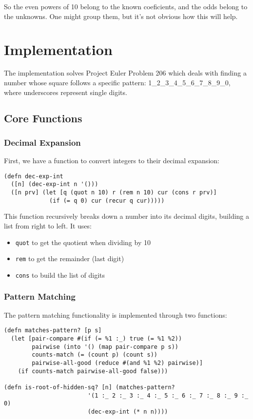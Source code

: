 \documentclass{article}
\begin{document}
So the even powers of 10 belong to the known coeficients, and the odds belong to the unknowns.  One might group
them, but it's not obvious how this will help.

\section{Implementation}

The implementation solves Project Euler Problem 206 which deals with finding a number whose square follows a specific pattern: 1_2_3_4_5_6_7_8_9_0, where underscores represent single digits.

\subsection{Core Functions}

\subsubsection{Decimal Expansion}
First, we have a function to convert integers to their decimal expansion:

\begin{lstlisting}
(defn dec-exp-int
  ([n] (dec-exp-int n '()))
  ([n prv] (let [q (quot n 10) r (rem n 10) cur (cons r prv)]
             (if (= q 0) cur (recur q cur)))))
\end{lstlisting}

This function recursively breaks down a number into its decimal digits, building a list from right to left. It uses:
\begin{itemize}
    \item \texttt{quot} to get the quotient when dividing by 10
    \item \texttt{rem} to get the remainder (last digit)
    \item \texttt{cons} to build the list of digits
\end{itemize}

\subsubsection{Pattern Matching}
The pattern matching functionality is implemented through two functions:

\begin{lstlisting}
(defn matches-pattern? [p s]
  (let [pair-compare #(if (= %1 :_) true (= %1 %2))
        pairwise (into '() (map pair-compare p s))
        counts-match (= (count p) (count s))
        pairwise-all-good (reduce #(and %1 %2) pairwise)]
    (if counts-match pairwise-all-good false)))

(defn is-root-of-hidden-sq? [n] (matches-pattern?
                        '(1 :_ 2 :_ 3 :_ 4 :_ 5 :_ 6 :_ 7 :_ 8 :_ 9 :_ 0)
                        (dec-exp-int (* n n))))
\end{lstlisting}
\end{document}
